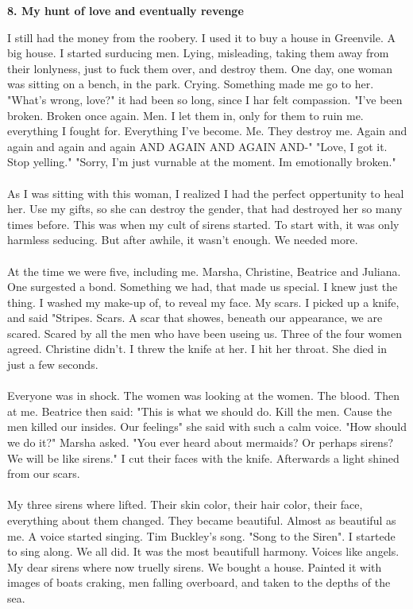 \documentclass[]{article}
\begin{document}
\newpage

\begin{center}
	\large\textbf{8. My hunt of love and eventually revenge}
\end{center}

I still had the money from the roobery. I used it to buy a house in Greenvile. A big house. I started surducing men. Lying, misleading, taking them away from their lonlyness, just to fuck them over, and destroy them. One day, one woman was sitting on a bench, in the park. Crying. Something made me go to her. "What's wrong, love?" it had been so long, since I har felt compassion. "I've been broken. Broken once again. Men. I let them in, only for them to ruin me. everything I fought for. Everything I've become. Me. They destroy me. Again and again and again and again AND AGAIN AND AGAIN AND-" "Love, I got it. Stop yelling." "Sorry, I'm just vurnable at the moment. Im emotionally broken."
\\ \\
As I was sitting with this woman, I realized I had the perfect oppertunity to heal her. Use my gifts, so she can destroy the gender, that had destroyed her so many times before. This was when my cult of sirens started. To start with, it was only harmless seducing. But after awhile, it wasn't enough. We needed more.
\\ \\
At the time we were five, including me. Marsha, Christine, Beatrice and Juliana. One surgested a bond. Something we had, that made us special. I knew just the thing. I washed my make-up of, to reveal my face. My scars. I picked up a knife, and said "Stripes. Scars. A scar that showes, beneath our appearance, we are scared. Scared by all the men who have been useing us. Three of the four women agreed. Christine didn't. I threw the knife at her. I hit her throat. She died in just a few seconds. 
\\ \\
Everyone was in shock. The women was looking at the women. The blood. Then at me. Beatrice then said: "This is what we should do. Kill the men. Cause the men killed our insides. Our feelings" she said with such a calm voice. "How should we do it?" Marsha asked. "You ever heard about mermaids? Or perhaps sirens? We will be like sirens." I cut their faces with the knife. Afterwards a light shined from our scars.  
\\ \\
My three sirens where lifted. Their skin color, their hair color, their face, everything about them changed. They became beautiful. Almost as beautiful as me. A voice started singing. Tim Buckley's song. "Song to the Siren". I startede to sing along. We all did. It was the most beautifull harmony. Voices like angels. My dear sirens where now truelly sirens. We bought a house. Painted it with images of boats craking, men falling overboard, and taken to the depths of the sea.
\end{document}
